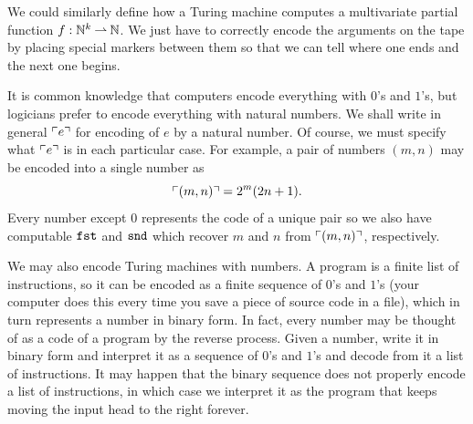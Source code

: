 We could similarly define how a Turing machine computes a multivariate
partial function $f : \mathbb{N}^k \mathbin{\rightharpoonup} \mathbb{N}$. We just have to correctly
encode the arguments on the tape by placing special markers between
them so that we can tell where one ends and the next one begins.

It is common knowledge that computers encode everything with $0$'s and
$1$'s, but logicians prefer to encode everything with natural numbers.
We shall write in general $\ulcorner e \urcorner$ for encoding of $e$ by a natural
number. Of course, we must specify what $\ulcorner e \urcorner$ is in each
particular case. For example, a pair of numbers $(m, n)$ may be
encoded into a single number as
%
\begin{equation*}
  \ulcorner (m, n) \urcorner = 2^m (2 n + 1).
\end{equation*}
%
Every number except $0$ represents the code of a unique pair so we
also have computable  $\mathtt{fst}$ and $\mathtt{snd}$ which
recover $m$ and $n$ from $\ulcorner (m, n) \urcorner$, respectively.

We may also encode Turing machines with numbers. A program is a finite
list of instructions, so it can be encoded as a finite sequence of
$0$'s and $1$'s (your computer does this every time you save a piece of
source code in a file), which in turn represents a number in binary
form. In fact, every number may be thought of as a code of a program
by the reverse process. Given a number, write it in binary form and
interpret it as a sequence of $0$'s and $1$'s and decode from it a
list of instructions. It may happen that the binary sequence does not
properly encode a list of instructions, in which case we interpret it
as the program that keeps moving the input head to the right forever.

